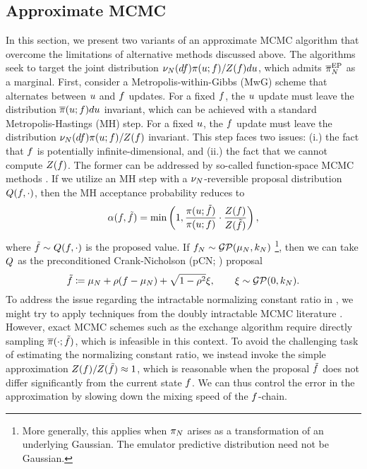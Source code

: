 \documentclass[12pt]{article}
\begin{document}
\subsection{Approximate MCMC}
In this section, we present two variants of an approximate MCMC algorithm that 
overcome the limitations of alternative methods discussed above. The algorithms seek 
to target the joint distribution 
$\nu_{N}(df) \pi(u; f)/Z(f) du$, which admits
$\overline{\pi}_{N}^{\mathrm{EP}}$ as a marginal. First, consider a Metropolis-within-Gibbs (MwG)
scheme that alternates between $u$ and $f$ updates. 
For a fixed $f$, the $u$ update must leave the distribution 
$\overline{\pi}(u; f) du$ invariant, which can be achieved 
with a standard Metropolis-Hastings (MH) step. For a fixed $u$, the $f$
update must leave the distribution 
$\nu_{N}(df) \pi(u; f)/Z(f)$
invariant. This step faces two issues: (i.) the fact that $f$ is potentially 
infinite-dimensional, and (ii.) the fact that we cannot compute 
$Z(f)$. The former can be addressed by so-called 
function-space MCMC methods \citep{functionSpaceMCMC}. If we utilize an
MH step with a $\nu_{N}$-reversible proposal distribution 
$Q(f, \cdot)$, then the MH acceptance probability reduces to
\begin{equation}
\alpha(f, \tilde{f})
= \min\left(1, \frac{\pi(u; \tilde{f})}{\pi(u; f)} \cdot 
\frac{Z(f)}{Z(\tilde{f})} \right),
\label{eq:MH-ratio-mwg}
\end{equation}
where $\tilde{f} \sim Q(f, \cdot)$ is the proposed value.
If $f_{N} \sim \mathcal{GP}(\mu_{N}, k_{N})$
\footnote{More generally, this applies when $\pi_{N}$ arises as a transformation
of an underlying Gaussian. The emulator predictive distribution need not be Gaussian.}, 
then we can take $Q$ as
the preconditioned Crank-Nicholson (pCN; \citet{functionSpaceMCMC}) proposal
\begin{equation}
\tilde{f} \coloneqq \mu_{N} + \rho (f  - \mu_{N}) + \sqrt{1 - \rho^2} \xi, 
\qquad \xi \sim \mathcal{GP}(0, k_{N}).
\end{equation}
To address the issue regarding the intractable normalizing constant ratio in 
, we might try to apply techniques from the doubly 
intractable MCMC literature \citep{doublyIntractableReview}. However, exact 
MCMC schemes such as the exchange algorithm \citep{exchangeAlg} require 
directly sampling $\overline{\pi}(\cdot; \tilde{f})$,
which is infeasible in this context. To avoid the challenging task of estimating the 
normalizing constant ratio, we instead invoke the simple approximation 
$Z(f)/Z(\tilde{f}) \approx 1$, which is reasonable when 
the proposal $\tilde{f}$ does not differ significantly from the current
state $f$. We can thus control the error in the approximation by slowing
down the mixing speed of the $f$-chain.
\end{document}
